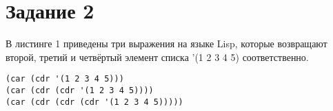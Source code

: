 \chapter{Задание \No{}2}

В листинге 1 приведены три выражения на языке Lisp, которые возвращают второй, третий и четвёртый элемент списка '(1 2 3 4 5) соответственно.

\lstset{language=lisp}
\begin{lstlisting}[caption={Выражения, возвращающие 2, 3 и 4 элементы списка}]
(car (cdr '(1 2 3 4 5)))
(car (cdr (cdr '(1 2 3 4 5))))
(car (cdr (cdr (cdr '(1 2 3 4 5)))))
\end{lstlisting}

